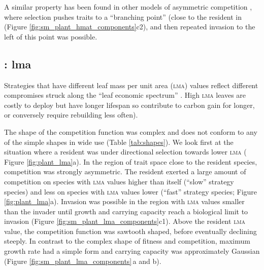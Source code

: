 \documentclass[a4paper,11pt]{article}
\begin{document}
A similar property has been found in other models of asymmetric
competition \citep[e.g.,][]{Kisdi-1999}, where selection pushes traits
to a ``branching point'' (close to the resident in (Figure
\ref{fig:sm_plant_hmat_components}c2), and then repeated invasion to
the left of this point was possible.


\subsection{\plant: lma}
Strategies that have different leaf mass per unit area (\textsc{lma})
values reflect different compromises struck along the ``leaf economic spectrum''
\citep{Reich-1997,Wright-2004}.  High \textsc{lma} leaves are
costly to deploy but have longer lifespan so contribute
to carbon gain for longer, or conversely require rebuilding less
often).

The shape of the competition function was complex and does not conform
to any of the simple shapes in wide use (Table \ref{tab:shapes}).
We look first at the situation where a resident was under directional
selection towards lower \textsc{lma} ( Figure \ref{fig:plant_lma}a).
%
In the region of trait space close to the resident species,
competition was strongly asymmetric. The resident exerted a large amount
of competition on species with \textsc{lma} values higher than itself (``slow''
strategy species) and less on species with \textsc{lma} values lower
(``fast'' strategy species; Figure \ref{fig:plant_lma}a).  Invasion was
possible in the region with \textsc{lma} values smaller than the invader until
growth and carrying capacity reach a biological limit to invasion
(Figure \ref{fig:sm_plant_lma_components}c1).
%
Above the resident \textsc{lma} value, the competition function was sawtooth
shaped, before eventually declining steeply.
%
In contrast to the complex shape of fitness and competition, maximum
growth rate had a simple form and carrying capacity was approximately
Gaussian (Figure \ref{fig:sm_plant_lma_components}\,a and b).
\end{document}
